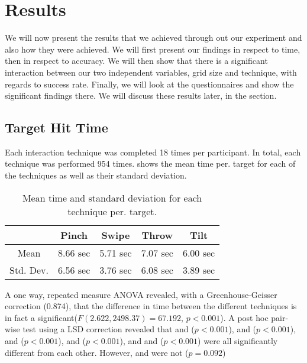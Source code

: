 \section{Results}
We will now present the results that we achieved through out our experiment and also how they were achieved. We will first present our findings in respect to time, then in respect to accuracy. We will then show that there is a significant interaction between our two independent variables, grid size and technique, with regards to success rate. Finally, we will look at the questionnaires and show the significant findings there. We will discuss these results later, in the  section.  

\subsection{Target Hit Time}

Each interaction technique was completed 18 times per participant. In total, each technique was performed 954 times.  shows the mean time per. target for each of the techniques as well as their standard deviation. 
\begin{table}[H]
	\centering
	\begin{tabular}{|c|c|c|c|c|}
		\hline
		\rowcolor[HTML]{9B9B9B} 
		 & \textbf{Pinch} & \textbf{Swipe} & \textbf{Throw} & \textbf{Tilt} \\ \hline
		Mean & 8.66  sec         & 5.71 sec          & 7.07 sec          & 6.00 sec         \\ \hline
		Std. Dev. & 6.56 sec & 3.76 sec & 6.08 sec & 3.89 sec \\ \hline
	\end{tabular}
	\caption{Mean time and standard deviation for each technique per. target.}
	\label{tab:meanTimesTechnique}
\end{table}

A one way, repeated measure ANOVA revealed, with a Greenhouse-Geisser correction (0.874), that the difference in time between the different techniques is in fact a significant($F(2.622, 2498.37)=67.192$, $p<0.001$). A post hoc pair-wise test using a LSD correction revealed that \pinch and \swipe($p<0.001$), \pinch and \tilt ($p<0.001$), \pinch and \throw ($p<0.001$), \swipe and \throw ($p<0.001$), and \throw and \tilt ($p<0.001$) were all significantly different from each other. However, \swipe and \tilt were not ($p=0.092$)

